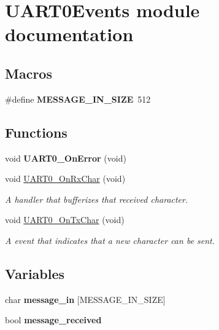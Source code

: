 \hypertarget{group___u_a_r_t0_events__module}{}\section{U\+A\+R\+T0\+Events module documentation}
\label{group___u_a_r_t0_events__module}
\subsection*{Macros}
\begin{DoxyCompactItemize}
\item 
\mbox{\label{group___u_a_r_t0_events__module_ga0a6be681e3cf415db61acfcf8ef8b49e}} 
\#define {\bfseries M\+E\+S\+S\+A\+G\+E\+\_\+\+I\+N\+\_\+\+S\+I\+ZE}~512
\end{DoxyCompactItemize}
\subsection*{Functions}
\begin{DoxyCompactItemize}
\item 
\mbox{\label{group___u_a_r_t0_events__module_gae0867ff7f63463faa263d1d2ac567ec8}} 
void {\bfseries U\+A\+R\+T0\+\_\+\+On\+Error} (void)
\item 
void \hyperlink{group___u_a_r_t0_events__module_gabb812347b38dc208a03fb309a1978ed6}{U\+A\+R\+T0\+\_\+\+On\+Rx\+Char} (void)
\begin{DoxyCompactList}\small\item\em A handler that bufferizes that received character. \end{DoxyCompactList}\item 
void \hyperlink{group___u_a_r_t0_events__module_ga96b3fd9eb4bbaf0ad2eb012cd3738ed0}{U\+A\+R\+T0\+\_\+\+On\+Tx\+Char} (void)
\begin{DoxyCompactList}\small\item\em A event that indicates that a new character can be sent. \end{DoxyCompactList}\end{DoxyCompactItemize}
\subsection*{Variables}
\begin{DoxyCompactItemize}
\item 
\mbox{\label{group___u_a_r_t0_events__module_ga35ff2cde27431c086ae7048c761c5c49}} 
char {\bfseries message\+\_\+in} \mbox{[}M\+E\+S\+S\+A\+G\+E\+\_\+\+I\+N\+\_\+\+S\+I\+ZE\mbox{]}
\item 
\mbox{\label{group___u_a_r_t0_events__module_ga9a75d3b2e50a13d5eed2e8c1068f0acb}} 
bool {\bfseries message\+\_\+received}
\end{DoxyCompactItemize}


